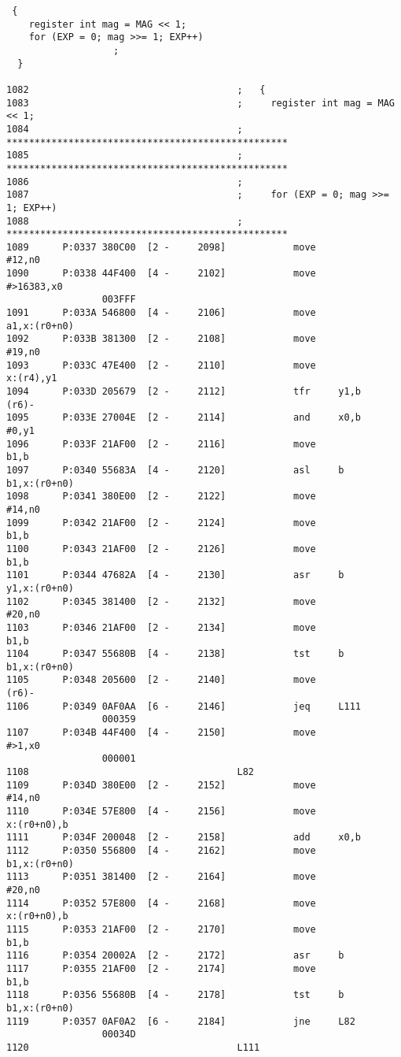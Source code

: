{\small
\begin{verbatim}
 {	
    register int mag = MAG << 1;
    for (EXP = 0; mag >>= 1; EXP++)
                   ; 
  } 

1082                                     ;   {
1083                                     ;     register int mag = MAG << 1;
1084                                     ; **************************************************
1085                                     ; **************************************************
1086                                     ; 
1087                                     ;     for (EXP = 0; mag >>= 1; EXP++)
1088                                     ; **************************************************
1089      P:0337 380C00  [2 -     2098]            move              #12,n0
1090      P:0338 44F400  [4 -     2102]            move              #>16383,x0
                 003FFF
1091      P:033A 546800  [4 -     2106]            move              a1,x:(r0+n0)
1092      P:033B 381300  [2 -     2108]            move              #19,n0
1093      P:033C 47E400  [2 -     2110]            move              x:(r4),y1
1094      P:033D 205679  [2 -     2112]            tfr     y1,b      (r6)-
1095      P:033E 27004E  [2 -     2114]            and     x0,b      #0,y1
1096      P:033F 21AF00  [2 -     2116]            move              b1,b
1097      P:0340 55683A  [4 -     2120]            asl     b         b1,x:(r0+n0)
1098      P:0341 380E00  [2 -     2122]            move              #14,n0
1099      P:0342 21AF00  [2 -     2124]            move              b1,b
1100      P:0343 21AF00  [2 -     2126]            move              b1,b
1101      P:0344 47682A  [4 -     2130]            asr     b         y1,x:(r0+n0)
1102      P:0345 381400  [2 -     2132]            move              #20,n0
1103      P:0346 21AF00  [2 -     2134]            move              b1,b
1104      P:0347 55680B  [4 -     2138]            tst     b         b1,x:(r0+n0)
1105      P:0348 205600  [2 -     2140]            move              (r6)-
1106      P:0349 0AF0AA  [6 -     2146]            jeq     L111
                 000359
1107      P:034B 44F400  [4 -     2150]            move              #>1,x0
                 000001
1108                                     L82
1109      P:034D 380E00  [2 -     2152]            move              #14,n0
1110      P:034E 57E800  [4 -     2156]            move              x:(r0+n0),b
1111      P:034F 200048  [2 -     2158]            add     x0,b
1112      P:0350 556800  [4 -     2162]            move              b1,x:(r0+n0)
1113      P:0351 381400  [2 -     2164]            move              #20,n0
1114      P:0352 57E800  [4 -     2168]            move              x:(r0+n0),b
1115      P:0353 21AF00  [2 -     2170]            move              b1,b
1116      P:0354 20002A  [2 -     2172]            asr     b
1117      P:0355 21AF00  [2 -     2174]            move              b1,b
1118      P:0356 55680B  [4 -     2178]            tst     b         b1,x:(r0+n0)
1119      P:0357 0AF0A2  [6 -     2184]            jne     L82
                 00034D
1120                                     L111
\end{verbatim}
}

